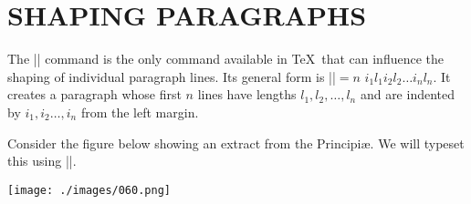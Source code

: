 \chapter{SHAPING PARAGRAPHS}
The |\parshape| command is the only command available in \TeX\ that can influence the shaping of individual  paragraph lines. Its general form is |\parshape|$=n\,\, i_1l_1i_2l_2\dots i_nl_n$. It creates a paragraph whose first $n$ lines have lengths $l_1,l_2,\dots, l_n$ and are indented by $i_1,i_2\dots,i_n$ from the left margin.

Consider the figure below showing an extract from the Principi\ae. We will typeset this using |\parshape|.
\pagebreak
\bgroup
\parindent=0pt
\small

\vspace*{4\baselineskip}

\hspace*{6.7cm}\texttt{[image: ./images/060.png]}
\vspace{-24\baselineskip}

\newlength{\inn}
\setlength{\inn}{210pt}

\newlength{\innn}
\setlength{\innn}{160pt}

\newlength{\innnn}
\setlength{\innnn}{90pt}

\newlength{\zz}
\setlength{\zz}{70pt}

